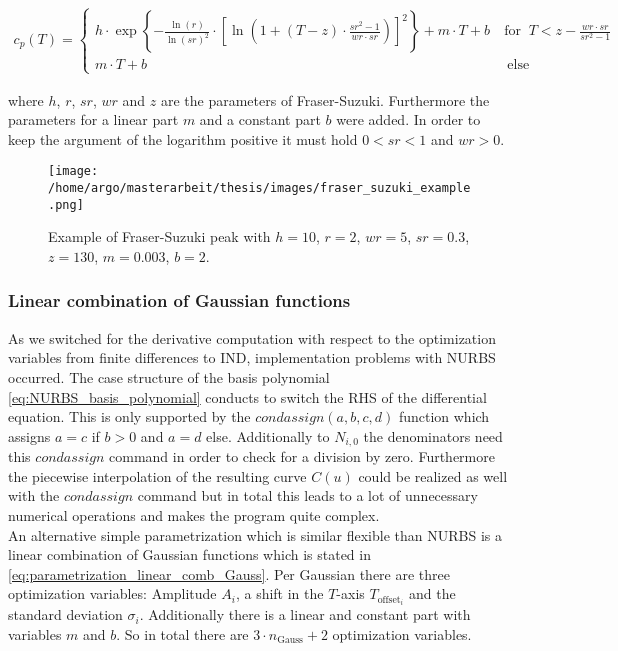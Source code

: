 \documentclass{scrartcl}[12pt, halfparskip]
\begin{document}
\begin{align}
	c_p(T) =
	\begin{cases}
		h \cdot \exp \left\{ - \frac{\ln(r)}{\ln(sr)^2} \cdot \left[ \ln\left( 1 + (T-z) \cdot \frac{sr^2 - 1}{wr \cdot sr} \right) \right]^2 \right\} + m \cdot T + b \ & \text{for } \ T < z - \frac{wr \cdot sr}{sr^2 - 1} \\
		m \cdot T + b \ & \ \text{else}
	\end{cases}
	\label{eq:fraser_suzuki}
\end{align}

where $h$, $r$, $sr$, $wr$ and $z$ are the parameters of Fraser-Suzuki. Furthermore the parameters for a linear part $m$ and a constant part $b$ were added. In order to keep the argument of the logarithm positive it must hold $0 < sr < 1$ and $wr > 0$.

\begin{figure}[H]
	\centering
	\texttt{[image: /home/argo/masterarbeit/thesis/images/fraser\_suzuki\_example.png]}
	\caption{Example of Fraser-Suzuki peak with $h=10$, $r=2$, $wr=5$, $sr=0.3$, $z=130$, $m=0.003$, $b=2$.}
	\label{fig:parametrization_example_fraser_suzuki}
\end{figure}



\subsubsection{Linear combination of Gaussian functions}
As we switched for the derivative computation with respect to the optimization variables from finite differences to IND, implementation problems with NURBS occurred. 
The case structure of the basis polynomial \eqref{eq:NURBS_basis_polynomial} conducts to switch the RHS of the differential equation. This is only supported by the $condassign(a,b,c,d)$ function which assigns $a=c$ if $b>0$ and $a=d$ else. Additionally to $N_{i,0}$ the denominators need this $condassign$ command in order to check for a division by zero. 
Furthermore the piecewise interpolation of the resulting curve $C(u)$ could be realized as well with the $condassign$ command but in total this leads to a lot of unnecessary numerical operations and makes the program quite complex. \\
An alternative simple parametrization which is similar flexible than NURBS is a linear combination of Gaussian functions which is stated in \eqref{eq:parametrization_linear_comb_Gauss}. Per Gaussian there are three optimization variables: Amplitude $A_i$, a shift in the $T$-axis $T_{\text{offset}_i}$ and the standard deviation $\sigma_i$. Additionally there is a linear and constant part with variables $m$ and $b$. So in total there are $3 \cdot n_{\text{Gauss}} + 2$ optimization variables. \\
\end{document}
